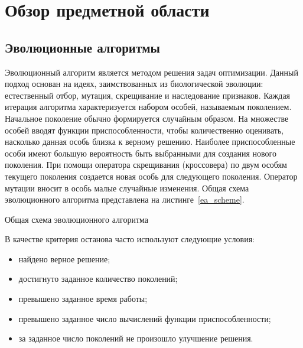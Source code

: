 \chapter{Обзор предметной области}
\label{chapter_review}

\section{Эволюционные алгоритмы}
Эволюционный алгоритм является методом решения задач оптимизации. Данный подход основан на идеях, заимствованных из биологической эволюции: естественный отбор, мутация, скрещивание и наследование признаков. Каждая итерация алгоритма характеризуется набором особей, называемым поколением. Начальное поколение обычно формируется случайным образом. На множестве особей вводят функции приспособленности, чтобы количественно оценивать, насколько данная особь близка к верному решению. Наиболее приспособленные особи имеют большую вероятность быть выбранными для создания нового поколения. При помощи оператора скрещивания (кроссовера) по двум особям текущего поколения создается новая особь для следующего поколения. Оператор мутации вносит в особь малые случайные изменения. Общая схема эволюционного алгоритма представлена на листинге~\ref{ea_scheme}.

\begin{algorithm}[h!]
\caption{Общая схема эволюционного алгоритма}
\label{ea_scheme}
\begin{algorithmic}[1]
  \ENDWHILE  
\end{algorithmic}
\end{algorithm}

В качестве критерия останова часто используют следующие условия:
\begin{itemize}
 \item найдено верное решение;
 \item достигнуто заданное количество поколений;
 \item превышено заданное время работы;
 \item превышено заданное число вычислений функции приспособленности;
 \item за заданное число поколений не произошло улучшение решения.
\end{itemize}

